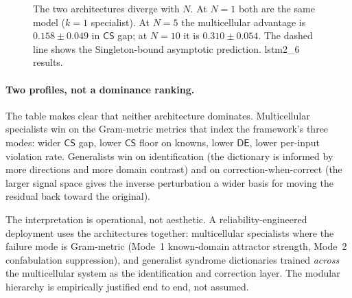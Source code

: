 \documentclass[11pt,a4paper]{article}
\newcommand{\CS}{\mathsf{CS}}
\newcommand{\DE}{\mathsf{DE}}
\begin{document}
\begin{figure}[H]
\centering
{}
\caption{The two architectures diverge with $N$. At $N = 1$ both are the same model ($k = 1$ specialist). At $N = 5$ the multicellular advantage is $0.158 \pm 0.049$ in $\CS$ gap; at $N = 10$ it is $0.310 \pm 0.054$. The dashed line shows the Singleton-bound asymptotic prediction. lstm2\_6 results.}
\label{fig:modular}
\end{figure}

\paragraph{Two profiles, not a dominance ranking.} The table makes clear that neither architecture dominates. Multicellular specialists win on the Gram-metric metrics that index the framework's three modes: wider $\CS$ gap, lower $\CS$ floor on knowns, lower $\DE$, lower per-input violation rate. Generalists win on identification (the dictionary is informed by more directions and more domain contrast) and on correction-when-correct (the larger signal space gives the inverse perturbation a wider basis for moving the residual back toward the original).

The interpretation is operational, not aesthetic. A reliability-engineered deployment uses the architectures together: multicellular specialists where the failure mode is Gram-metric (Mode~1 known-domain attractor strength, Mode~2 confabulation suppression), and generalist syndrome dictionaries trained \emph{across} the multicellular system as the identification and correction layer. The modular hierarchy is empirically justified end to end, not assumed.
\end{document}
